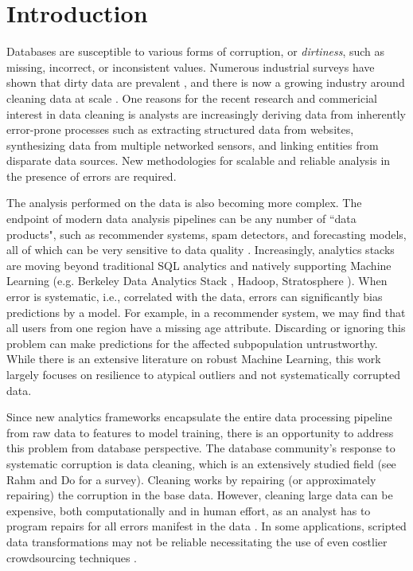 \section{Introduction}
Databases are susceptible to various forms of corruption, or \emph{dirtiness}, such as missing, incorrect, or inconsistent values.
Numerous industrial surveys have shown that dirty data are prevalent \cite{Gartner}, and there is now a growing industry around cleaning data at scale \cite{fortunearticle}.
One reasons for the recent research and commericial interest in data cleaning is analysts are increasingly deriving data from inherently error-prone processes such as extracting structured data from websites, synthesizing data from multiple networked sensors, and linking entities from disparate data sources.
New methodologies for scalable and reliable analysis in the presence of errors are required. 

The analysis performed on the data is also becoming more complex.
The endpoint of modern data analysis pipelines can be any number of ``data products", such as recommender systems, spam detectors, and forecasting models, all of which can be very sensitive to data quality \cite{xiaofeature}.
Increasingly, analytics stacks are moving beyond traditional SQL analytics and natively supporting Machine Learning (e.g. Berkeley Data Analytics Stack \cite{bdas}, Hadoop, Stratosphere \cite{alexandrov2014stratosphere}).
When error is systematic, i.e., correlated with the data, errors can significantly bias predictions by a model.
For example, in a recommender system, we may find that all users from one region have a missing age attribute.
Discarding or ignoring this problem can make predictions for the affected subpopulation untrustworthy.
While there is an extensive literature on robust Machine Learning, this work largely focuses on resilience to atypical outliers and not systematically corrupted data.

Since new analytics frameworks encapsulate the entire data processing pipeline from raw data to features to model training, there is an opportunity to address this problem from database perspective.  
The database community's response to systematic corruption is data cleaning, which is an extensively studied field (see Rahm and Do \cite{rahm2000data} for a survey).
Cleaning works by repairing (or approximately repairing) the corruption in the base data.
However, cleaning large data can be expensive, both computationally and in human effort, as an analyst has to program repairs for all errors manifest in the data \cite{kandel2012}.
In some applications, scripted data transformations may not be reliable necessitating the use of even costlier crowdsourcing techniques \cite{gokhale2014corleone,park2014crowdfill}.

